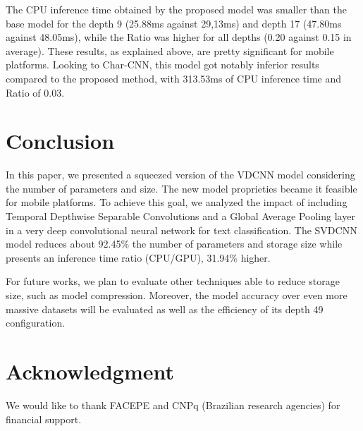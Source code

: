 \documentclass[conference]{IEEEtran}
\begin{document}
\noindent The CPU inference time obtained by the proposed model was smaller than the base model for the depth 9 (25.88ms against 29,13ms) and depth 17 (47.80ms against 48.05ms), while the Ratio was higher for all depths (0.20 against 0.15 in average). These results, as explained above, are pretty significant for mobile platforms. Looking to Char-CNN, this model got notably inferior results compared to the proposed method, with 313.53ms of CPU inference time and Ratio of 0.03.

\section{Conclusion}
In this paper, we presented a squeezed version of the VDCNN model considering the number of parameters and size. The new model proprieties became it feasible for mobile platforms. To achieve this goal, we analyzed the impact of including Temporal Depthwise Separable Convolutions and a Global Average Pooling layer in a very deep convolutional neural network for text classification. The SVDCNN model reduces about 92.45\% the number of parameters and storage size while presents an inference time ratio (CPU/GPU), 31.94\% higher.  

For future works, we plan to evaluate other techniques able to reduce storage size, such as model compression. Moreover, the model accuracy over even more massive datasets will be evaluated as well as the efficiency of its depth 49 configuration.

\section*{Acknowledgment}
We would like to thank FACEPE and CNPq (Brazilian research agencies) for financial support.





  
  
\end{document}
